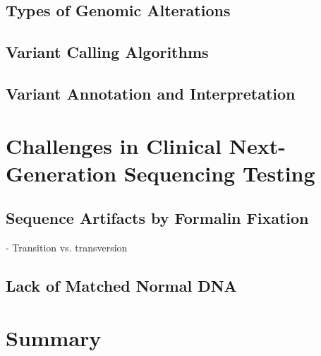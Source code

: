 \subsection{Types of Genomic Alterations}

\subsection{Variant Calling Algorithms}

\subsection{Variant Annotation and Interpretation}

\section{Challenges in Clinical Next-Generation Sequencing Testing}
\label{sec:Challenges in Clinical Next-Generation Sequencing Testing}

\subsection{Sequence Artifacts by Formalin Fixation}
- Transition vs. transversion

\subsection{Lack of Matched Normal DNA}

\section{Summary}
\label{sec:Summary}


\endinput

Key words: pharmacogenomic, germline variants, targeted amplicon-based MPS panel, formalin artifacts, tumour-only genomic profiling, patient care, treatment outcome, treatment response, risk stratification, susceptibility, toxicity, adverse drug events

This emerging framework of genomics-driven cancer medicine involves screening for genomic alterations that have diagnostic, prognostic, predictive or pharmacogenomic (PGx) clinical utility. Diagnostic biomarkers facilitate tumour type or subtype classification whereas prognostic biomarkers provide information on disease outcome based on overall and disease-free survival rates. Moreover, predictive biomarkers would inform treatment selection while PGx biomarkers assist with reducing drug toxicity through optimization of treatment dosage and duration.


